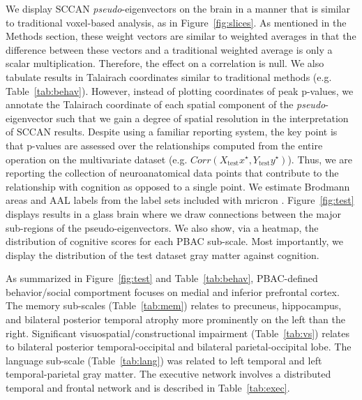 \documentclass[preprint,authoryear,12pt]{elsarticle}
\begin{document}
  We display SCCAN {\em pseudo}-eigenvectors on the brain in a manner that is similar to traditional voxel-based analysis, as in Figure~\ref{fig:slices}.  As mentioned in the Methods section, these weight vectors are similar to weighted averages in that the difference between these vectors and a traditional weighted average is only a scalar multiplication.  Therefore, the effect on a correlation is null.  We also tabulate results in Talairach coordinates similar to traditional methods (e.g. Table~\ref{tab:behav}).  However, instead of plotting coordinates of peak p-values, we annotate the Talairach coordinate of each spatial component of the {\em pseudo}-eigenvector such that we gain a degree of spatial resolution in the interpretation of SCCAN results.  Despite using a familiar reporting system, the key point is that p-values are assessed over the relationships computed from the entire operation on the multivariate dataset (e.g. $Corr(X_\text{test} x^\star,Y_\text{test} y^\star)$).  Thus, we are reporting the collection of neuroanatomical data points that contribute to the relationship with cognition as opposed to a single point.  We estimate Brodmann areas and AAL labels from the label sets included with mricron \citet{Rorden2007a}.  Figure~\ref{fig:test} displays results in a glass brain where we draw connections between the major sub-regions of the pseudo-eigenvectors.  We also show, via a heatmap, the distribution of cognitive scores for each PBAC sub-scale.  Most importantly, we display the distribution of the test dataset gray matter against cognition.

As summarized in Figure~\ref{fig:test} and Table~\ref{tab:behav}, PBAC-defined behavior/social comportment focuses on medial and inferior prefrontal cortex.  The memory sub-scales (Table~\ref{tab:mem}) relates to precuneus, hippocampus, and bilateral posterior temporal atrophy more prominently on the left than the right.  Significant visuospatial/constructional impairment (Table~\ref{tab:vs}) relates to bilateral posterior temporal-occipital and bilateral parietal-occipital lobe.  The language sub-scale (Table~\ref{tab:lang}) was related to left temporal and left temporal-parietal gray matter.  The executive network involves a distributed temporal and frontal network and is described in Table~\ref{tab:exec}.  






\end{document}
